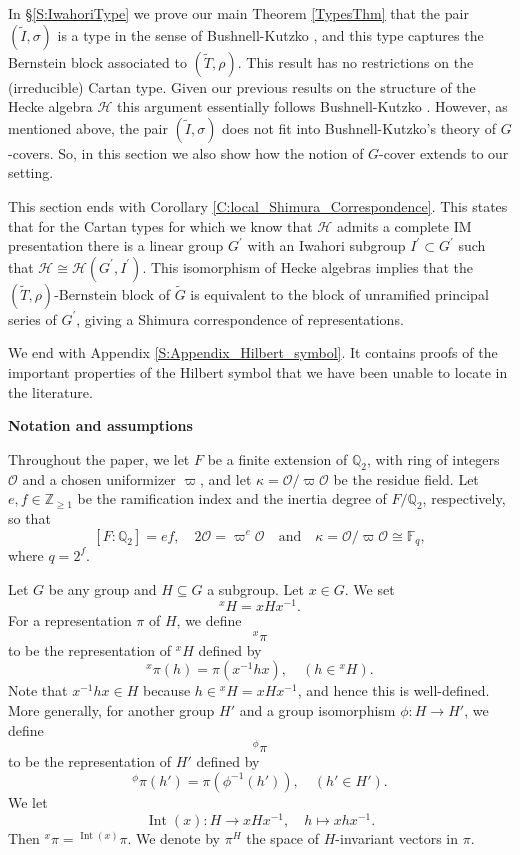 \documentclass[10pt, letterpaper]{amsart}
\theoremstyle{plain}
\theoremstyle{definition}
\numberwithin{equation}{section}
\newcommand{\F}{\mathbb{F}}
\newcommand{\Q}{\mathbb{Q}}
\newcommand{\Z}{\mathbb{Z}}
\newcommand{\Gt}{\widetilde{G}}
\newcommand{\It}{\widetilde{I}}
\newcommand{\Tt}{\widetilde{T}}
\newcommand{\Int}{\operatorname{Int}}
\newcommand{\Ocal}{\mathcal{O}}
\newcommand{\Hcal}{\mathcal{H}}
\newcommand{\qand}{{\quad\text{and}\quad}}
\begin{document}
In \S \ref{S:IwahoriType} we prove our main Theorem \ref{TypesThm} that the pair $(\It,\sigma)$ is a type in the sense of Bushnell-Kutzko \cite[(4.1) Definition]{BK98}, and this type captures the Bernstein block associated to $(\Tt,\rho)$. This result has no restrictions on the (irreducible) Cartan type. Given our previous results on the structure of the Hecke algebra $\Hcal$ this argument essentially follows Bushnell-Kutzko \cite{BK98}. However, as mentioned above, the pair $(\It,\sigma)$ does not fit into Bushnell-Kutzko's theory of $G$-covers. So, in this section we also show how the notion of $G$-cover extends to our setting.

This section ends with Corollary \ref{C:local_Shimura_Correspondence}. This states that for the Cartan types for which we know that $\Hcal$ admits a complete IM presentation there is a linear group $G^{\prime}$ with an Iwahori subgroup $I^{\prime}\subset G^{\prime}$ such that $\Hcal\cong \Hcal(G^{\prime},I^{\prime})$. This isomorphism of Hecke algebras implies that the $(\Tt,\rho)$-Bernstein block of $\Gt$ is equivalent to the block of unramified principal series of $G^{\prime}$, giving a Shimura correspondence of representations.

We end with Appendix \ref{S:Appendix_Hilbert_symbol}. It contains proofs of the important properties of the Hilbert symbol that we have been unable to locate in the literature. 



\quad

\begin{center}{\bf Notation and assumptions}\end{center}

Throughout the paper, we let $F$ be a finite extension of $\Q_2$, with ring of integers $\Ocal$ and a chosen uniformizer $\varpi$, and let $\kappa=\Ocal\slash\varpi\Ocal$ be the residue field. Let $e, f\in\Z_{\geq 1}$ be the ramification index and the inertia degree of $F\slash\Q_2$, respectively, so that
\[
[F:\Q_2]=ef,\quad 2\Ocal=\varpi^e\Ocal\qand \kappa=\Ocal\slash\varpi\Ocal\cong \F_{q},
\]
where $q=2^f$.

Let $G$ be any group and $H\subseteq G$ a subgroup. Let $x\in G$. We set
\[
^xH=xHx^{-1}.
\]
For a representation $\pi$ of $H$, we define
\[
^x\pi
\]
to be the representation of ${^xH}$ defined by
\[
^x\pi(h)=\pi(x^{-1}hx),\quad (h\in {^xH}).
\]
Note that $x^{-1}hx\in H$ because $h\in{^xH}=xHx^{-1}$, and hence this is well-defined. More generally, for another group $H'$ and a group isomorphism $\phi:H\to H'$, we define 
\[
^\phi\pi
\]
to be the representation of $H'$ defined by
\begin{equation}\label{E:definition_phi_pi}
^\phi\pi(h')=\pi(\phi^{-1}(h')),\quad(h'\in H').
\end{equation}
We let
\[
\Int(x):H\longrightarrow xHx^{-1},\quad h\mapsto xhx^{-1}.
\]
Then $^x\pi={^{\Int(x)}}\pi$. We denote by $\pi^H$ the space of $H$-invariant vectors in $\pi$.
\end{document}

